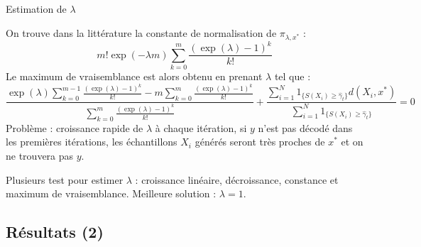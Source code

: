 \documentclass[10pt,xcolor=table,color={dvipsnames,usenames},ignorenonframetext,usepdftitle=false,french]{beamer}
\begin{document}
\begin{frame}{Estimation de \(\lambda\)}

On trouve dans la littérature la constante de normalisation de
\(\pi_{\lambda,x^*}\) : \[
m!\exp(-\lambda m)\sum_{k=0}^{m}\frac{(\exp(\lambda)-1)^{k}}{k!}
\] Le maximum de vraisemblance est alors obtenu en prenant \(\lambda\)
tel que : \[
\frac{
\exp(\lambda)\sum_{k=0}^{m-1}\frac{(\exp(\lambda)-1)^{k}}{k!} -
m\sum_{k=0}^{m}\frac{(\exp(\lambda)-1)^{k}}{k!}
}{
\sum_{k=0}^{m}\frac{(\exp(\lambda)-1)^{k}}{k!}
} +
\frac{\sum_{i=1}^N 1_{\{S(X_{i})\geq\hat{\gamma}_{t}\}}d(X_i,x^*)}{\sum_{i=1}^N 1_{\{S(X_{i})\geq\hat{\gamma}_{t}\}}} = 0
\] Problème : croissance rapide de \(\lambda\) à chaque itération, si
\(y\) n'est pas décodé dans les premières itérations, les échantillons
\(X_i\) générés seront très proches de \(x^*\) et on ne trouvera pas
\(y\).

Plusieurs test pour estimer \(\lambda\) : croissance linéaire,
décroissance, constance et maximum de vraisemblance. Meilleure solution
: \(\lambda = 1\).

\end{frame}

\subsection{Résultats (2)}\label{ruxe9sultats-2-1}
\end{document}
